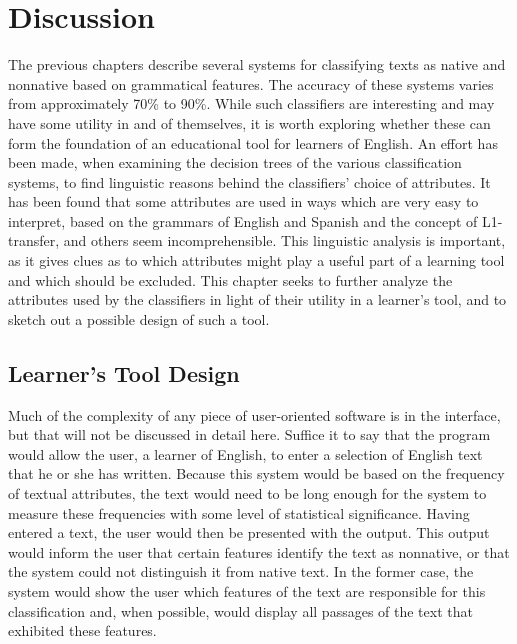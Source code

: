 \documentclass[main.tex]{subfiles}
\begin{document}
\section{Discussion}

The previous chapters describe several systems for classifying texts as native and nonnative based on grammatical features. The accuracy of these systems varies from approximately 70\% to 90\%. While such classifiers are interesting and may have some utility in and of themselves, it is worth exploring whether these can form the foundation of an educational tool for learners of English. An effort has been made, when examining the decision trees of the various classification systems, to find linguistic reasons behind the classifiers' choice of attributes. It has been found that some attributes are used in ways which are very easy to interpret, based on the grammars of English and Spanish and the concept of L1-transfer, and others seem incomprehensible. This linguistic analysis is important, as it gives clues as to which attributes might play a useful part of a learning tool and which should be excluded. This chapter seeks to further analyze the attributes used by the classifiers in light of their utility in a learner's tool, and to sketch out a possible design of such a tool.

\subsection{Learner's Tool Design}

Much of the complexity of any piece of user-oriented software is in the interface, but that will not be discussed in detail here. Suffice it to say that the program would allow the user, a learner of English, to enter a selection of English text that he or she has written. Because this system would be based on the frequency of textual attributes, the text would need to be long enough for the system to measure these frequencies with some level of statistical significance. Having entered a text, the user would then be presented with the output. This output would inform the user that certain features identify the text as nonnative, or that the system could not distinguish it from native text. In the former case, the system would show the user which features of the text are responsible for this classification and, when possible, would display all passages of the text that exhibited these features.
\end{document}
